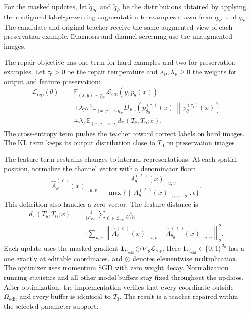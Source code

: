 \documentclass[10pt,journal,compsoc]{IEEEtran}
\theoremstyle{definition}
\begin{document}
For the masked updates, let $\widetilde q_{\mathcal H}$ and
$\widetilde q_{\mathcal P}$ be the distributions obtained
by applying the configured label-preserving augmentation to
examples drawn from $q_{\mathcal H}$ and $q_{\mathcal P}$.
The candidate and original teacher receive the same
augmented view of each preservation example. Diagnosis and
channel screening use the unaugmented images.

The repair objective has one term for hard examples and two
for preservation examples. Let $\tau_{\mathrm r}>0$ be the
repair temperature and $\lambda_{\mathrm P},\lambda_{\mathrm F}
\geq0$ the weights for output and feature preservation:
\begin{equation}
\label{eq:teacher-repair-loss}
\begin{aligned}
\mathcal L_{\mathrm{rep}}(\theta)
={}&\mathbb E_{(x,y)\sim\widetilde q_{\mathcal H}}
  \mathcal L_{\mathrm{CE}}(y,p_\theta(x))\\
&+\lambda_{\mathrm P}\tau_{\mathrm r}^{2}
\mathbb E_{(x,y)\sim\widetilde q_{\mathcal P}}
 D_{\mathrm{KL}}\!\left(
 p_{\theta_0}^{(\tau_{\mathrm r})}(x)
 \,\middle\|\,p_\theta^{(\tau_{\mathrm r})}(x)\right)\\
&+\lambda_{\mathrm F}
\mathbb E_{(x,y)\sim\widetilde q_{\mathcal P}}
 d_{\mathrm F}(T_\theta,T_0;x).
\end{aligned}
\end{equation}
The cross-entropy term pushes the teacher toward correct
labels on hard images. The KL term keeps its output
distribution close to $T_0$ on preservation images.

The feature term restrains changes to internal
representations. At each spatial position, normalize the
channel vector with a denominator floor:
\begin{equation}
\label{eq:repair-feature-normalization}
\widehat A_\theta^{(\ell)}(x)_{:,u,v}
=
\frac{A_\theta^{(\ell)}(x)_{:,u,v}}
{\max\{\|A_\theta^{(\ell)}(x)_{:,u,v}\|_2,\epsilon\}}.
\end{equation}
This definition also handles a zero vector. The feature
distance is
\begin{equation}
\label{eq:repair-feature-loss}
\begin{aligned}
d_{\mathrm F}(T_\theta,T_0;x)
={}&\frac{1}{|\mathcal L_{\mathrm{loc}}|}
\sum_{\ell\in\mathcal L_{\mathrm{loc}}}
\frac{1}{U_\ell V_\ell}\\
&\cdot\sum_{u,v}
\left\|
\widehat A_\theta^{(\ell)}(x)_{:,u,v}
-\widehat A_{\theta_0}^{(\ell)}(x)_{:,u,v}
\right\|_2^2.
\end{aligned}
\end{equation}
Each update uses the masked gradient
$\mathbf{1}_{\Omega_{\mathrm{edit}}}\odot
\nabla_\theta\mathcal L_{\mathrm{rep}}$.
Here $\mathbf{1}_{\Omega_{\mathrm{edit}}}\in\{0,1\}^{d_\theta}$
has a one exactly at editable coordinates, and $\odot$
denotes elementwise multiplication.
The optimizer uses momentum SGD with zero weight decay.
Normalization running statistics and all other model buffers
stay fixed throughout the updates. After optimization,
the implementation verifies that every coordinate outside
$\Omega_{\mathrm{edit}}$ and every buffer is identical to
$T_0$. The result is a teacher repaired within the selected
parameter support.
\end{document}

